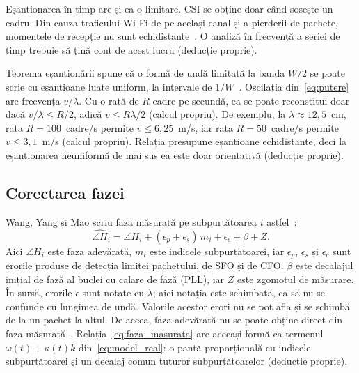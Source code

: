 Eșantionarea în timp are și ea o limitare.
CSI se obține doar când sosește un cadru.
Din cauza traficului Wi-Fi de pe același canal și a pierderii de pachete, momentele de recepție nu sunt echidistante~\cite[Sec.~II-E]{chen2018trbreath}.
O analiză în frecvență a seriei de timp trebuie să țină cont de acest lucru (deducție proprie).

Teorema eșantionării spune că o formă de undă limitată la banda $W/2$ se poate scrie cu eșantioane luate uniform, la intervale de $1/W$~\cite[Sec.~2.2.3]{tse2005}.
Oscilația din~\eqref{eq:putere} are frecvența $v/\lambda$.
Cu o rată de $R$ cadre pe secundă, ea se poate reconstitui doar dacă $v/\lambda \le R/2$, adică $v \le R\lambda/2$ (calcul propriu).
De exemplu, la $\lambda \approx 12{,}5$~cm, rata $R = 100$~cadre/s permite $v \le 6{,}25$~m/s, iar rata $R = 50$~cadre/s permite $v \le 3{,}1$~m/s (calcul propriu).
Relația presupune eșantioane echidistante, deci la eșantionarea neuniformă de mai sus ea este doar orientativă (deducție proprie).

\subsection{Corectarea fazei}\label{subsec:corectie_faza}

Wang, Yang și Mao scriu faza măsurată pe subpurtătoarea $i$ astfel~\cite[ec.~(3)--(4)]{wang2020phasebeat}:
\begin{equation}\label{eq:faza_masurata}
	\widehat{\angle H}_i = \angle H_i + (\epsilon_p + \epsilon_s)\, m_i + \epsilon_c + \beta + Z.
\end{equation}
Aici $\angle H_i$ este faza adevărată, $m_i$ este indicele subpurtătoarei, iar $\epsilon_p$, $\epsilon_s$ și $\epsilon_c$ sunt erorile produse de detecția limitei pachetului, de SFO și de CFO.
$\beta$ este decalajul inițial de fază al buclei cu calare de fază (PLL), iar $Z$ este zgomotul de măsurare.
În sursă, erorile $\epsilon$ sunt notate cu $\lambda$; aici notația este schimbată, ca să nu se confunde cu lungimea de undă.
Valorile acestor erori nu se pot afla și se schimbă de la un pachet la altul.
De aceea, faza adevărată nu se poate obține direct din faza măsurată~\cite[Sec.~2.2]{wang2020phasebeat}.
Relația~\eqref{eq:faza_masurata} are aceeași formă ca termenul $\omega(t) + \kappa(t)k$ din~\eqref{eq:model_real}: o pantă proporțională cu indicele subpurtătoarei și un decalaj comun tuturor subpurtătoarelor (deducție proprie).

